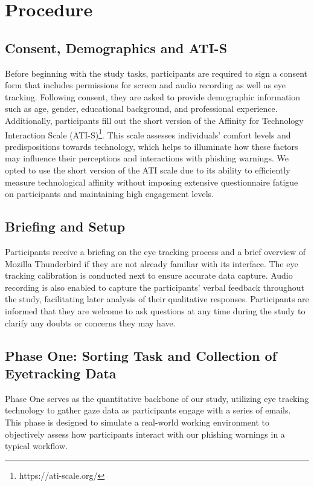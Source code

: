 \documentclass[
  a4paper,  %
  twoside,  %
  bibliography=totoc,
  headsepline,
  cleardoublepage=empty,
  parskip=half,
  draft=false
]{scrbook}
\begin{document}
\section{Procedure}

\subsection{Consent, Demographics and ATI-S}

Before beginning with the study tasks, participants are required to sign a consent form that includes permissions for screen and audio recording as well as eye tracking. Following consent, they are asked to provide demographic information such as age, gender, educational background, and professional experience. Additionally, participants fill out the short version of the Affinity for Technology Interaction Scale (ATI-S)\footnote{https://ati-scale.org/}. This scale assesses individuals' comfort levels and predispositions towards technology, which helps to illuminate how these factors may influence their perceptions and interactions with phishing warnings. \newline
We opted to use the short version of the ATI scale due to its ability to efficiently measure technological affinity without imposing extensive questionnaire fatigue on participants and maintaining high engagement levels.

\subsection{Briefing and Setup}

Participants receive a briefing on the eye tracking process and a brief overview of Mozilla Thunderbird if they are not already familiar with its interface. The eye tracking calibration is conducted next to ensure accurate data capture. Audio recording is also enabled to capture the participants' verbal feedback throughout the study, facilitating later analysis of their qualitative responses. Participants are informed that they are welcome to ask questions at any time during the study to clarify any doubts or concerns they may have.

\subsection{Phase One: Sorting Task and Collection of Eyetracking Data}

Phase One serves as the quantitative backbone of our study, utilizing eye tracking technology to gather gaze data as participants engage with a series of emails. This phase is designed to simulate a real-world working environment to objectively assess how participants interact with our phishing warnings in a typical workflow. 
\end{document}
